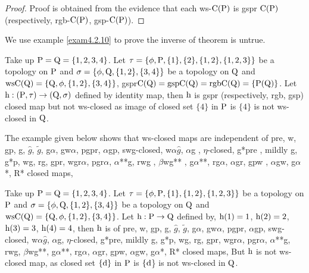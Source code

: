 \begin{proof}
Proof is obtained from the evidence that each ws-$\mathrm{C}(\mathrm{P})$ is gspr $\mathrm{C}(\mathrm{P})$ (respectively, rgb-$\mathrm{C}(\mathrm{P})$, gsp-$\mathrm{C}(\mathrm{P})$).
\end{proof}

We use example \ref{exam4.2.10} to prove the inverse of theorem is untrue.

\begin{exm}\label{exam4.2.10} 
Take up $\mathrm{P}=\mathrm{Q}= \{1, 2, 3, 4\}$. Let $\tau= \{\phi, \TSP, \{1\}, \{2\}, \{1, 2\},\break \{1,2,3\}\}$ be a topology on $\mathrm{P}$ and $\sigma=\{\phi, \mathrm{Q}, \{1,2\}, \{3,4 \} \}$ be a topology on $\mathrm{Q}$ and $\mathrm{ws}\mathrm{C}(\mathrm{Q})= \{\mathrm{Q}, \phi, \{1,2\},\{3,4 \}\}$, gspr$\mathrm{C}(\mathrm{Q})=\mathrm{gsp}\mathrm{C}(\mathrm{Q})=\mathrm{rgb}\mathrm{C}(\mathrm{Q})=\{\mathrm{P}(\mathrm{Q})\}$. Let $\mathrm{h}: (\mathrm{P}, \tau) \to (\mathrm{Q},\sigma)$ defined by identity map, then $\mathrm{h}$ is gspr (respectively, rgb, gsp) closed map but not ws-closed as image of closed set $\{4\}$ in $\mathrm{P}$ is $\{4\}$ is not ws-closed in $\mathrm{Q}$.
\end{exm}

\begin{rem}\label{rem4.2.11}
The example given below shows that ws-closed maps are independent of pre, w, gp, g, $\hat{g}$, $\tilde{g}$, g$\alpha$, gw$\alpha$, pgpr, $\alpha$gp, swg-closed, w$\alpha\hat{g}$, $\alpha$g , $\eta$-closed, g*pre , mildly g, g*p, wg, rg, gpr, wgr$\alpha$, pgr$\alpha$, $\alpha$**g, rwg , $\beta$wg** , g$\alpha$**, rg$\alpha$, $\alpha$gr, gpw , $\alpha$gw, g$\alpha$*, R* closed maps,
\end{rem}

\begin{exm}\label{exam4.2.12}
Take up $\mathrm{P}=\mathrm{Q}= \{1, 2, 3, 4\}$. Let $\tau= \{\phi, \mathrm{P}, \{1\},\{1, 2\},\{1,2,3\}\}$ be a topology on $\mathrm{P}$ and $\sigma=\{\phi, \mathrm{Q}, \{1,2\}, \{3,4 \}\}$ be a topology on $\mathrm{Q}$ and $\mathrm{ws}\mathrm{C}(\mathrm{Q})= \{\mathrm{Q}, \phi, \{1,2\}, \{3,4 \}\}$. Let $\mathrm{h}: \mathrm{P} \to \mathrm{Q}$ defined by, $\mathrm{h}(1) = 1$, $\mathrm{h}(2) = 2$, $\mathrm{h}(3) = 3$, $\mathrm{h}(4)=4$, then $\mathrm{h}$ is of pre, w, gp, g, $\hat{g}$, $\tilde{g}$, g$\alpha$, gw$\alpha$, pgpr, $\alpha$gp, swg-closed, w$\alpha\hat{g}$, $\alpha$g, $\eta$-closed, g*pre, mildly g, g*p, wg, rg, gpr, wgr$\alpha$, pgr$\alpha$, $\alpha$**g, rwg, $\beta$wg**, g$\alpha$**, rg$\alpha$, $\alpha$gr, gpw, $\alpha$gw, g$\alpha$*, R* closed maps, But $\mathrm{h}$ is not ws-closed map, as closed set $\{\mathrm{d}\}$ in $\mathrm{P}$ is $\{\mathrm{d}$\} is not ws-closed in $\mathrm{Q}$.
\end{exm}

